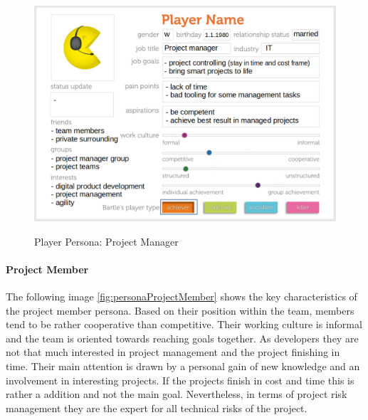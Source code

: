 \begin{figure}[H]
	\centering
	\includegraphics[width=1.0\textwidth]{Content/Domain/PersonaProjectManager.png}
	\caption{Player Persona: Project Manager}
	\label{fig:personaProjectManager}
	\cite[p. 88; adapted]{kumarGamificationWorkDesigning2013}
\end{figure}

\paragraph*{Project Member}

The following image \ref{fig:personaProjectMember} shows the key characteristics of the project member persona.
Based on their position within the team, members tend to be rather cooperative than competitive. Their working culture is informal and the team is oriented towards reaching goals together. As developers they are not that much interested in project management and the project finishing in time. Their main attention is drawn by a personal gain of new knowledge and an involvement in interesting projects. If the projects finish in cost and time this is rather a addition and not the main goal. Nevertheless, in terms of project risk management they are the expert for all technical risks of the project.

